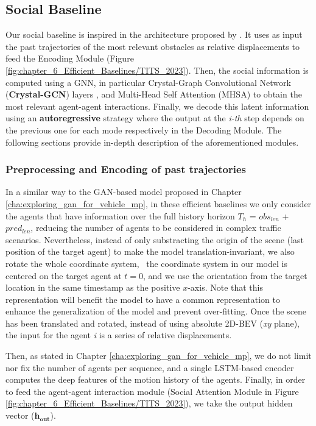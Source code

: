 \subsection{Social Baseline}
\label{subsec:6_efficient_baselines_social}

Our social baseline is inspired in the architecture proposed by \cite{schmidt2022crat}. It uses as input the past trajectories of the most relevant obstacles as relative displacements to feed the Encoding Module (Figure \ref{fig:chapter_6_Efficient_Baselines/TITS_2023}). Then, the social information is computed using a \ac{GNN}, in particular Crystal-Graph Convolutional Network (\textbf{Crystal-GCN}) layers \cite{xie2018crystal, schmidt2022crat}, and Multi-Head Self Attention (MHSA) \cite{vaswani2017attention} to obtain the most relevant agent-agent interactions. Finally, we decode this latent information using an \textbf{autoregressive} strategy where the output at the \textit{i-th} step depends on the previous one for each mode respectively in the Decoding Module. The following sections provide in-depth description of the aforementioned modules.

\subsubsection{Preprocessing and Encoding of past trajectories}
\label{subsubsec:6_efficient_baselines_social_preprocessing_and_encoding}

In a similar way to the GAN-based model proposed in Chapter \ref{cha:exploring_gan_for_vehicle_mp}, in these efficient baselines we only consider the agents that have information over the full history horizon $T_h$ = \textit{$obs_{len}$} + \textit{$pred_{len}$}, reducing the number of agents to be considered in complex traffic scenarios. Nevertheless, instead of only substracting the origin of the scene (last position of the target agent) to make the model translation-invariant, we also rotate the whole coordinate system, \ie \ the coordinate system in our model is centered on the target agent at $t = 0$, and we use the orientation from the target location in the same timestamp as the positive $x$-axis. Note that this representation will benefit the model to have a common representation to enhance the generalization of the model and prevent over-fitting. Once the scene has been translated and rotated, instead of using absolute 2D-BEV (\textit{xy} plane), the input for the agent \textit{i} is a series of relative displacements.

Then, as stated in Chapter \ref{cha:exploring_gan_for_vehicle_mp}, we do not limit nor fix the number of agents per sequence, and a single \ac{LSTM}-based encoder computes the deep features of the motion history of the agents. Finally, in order to feed the agent-agent interaction module (Social Attention Module in Figure \ref{fig:chapter_6_Efficient_Baselines/TITS_2023}), we take the output hidden vector ($\mathbf{h_{out}}$).

